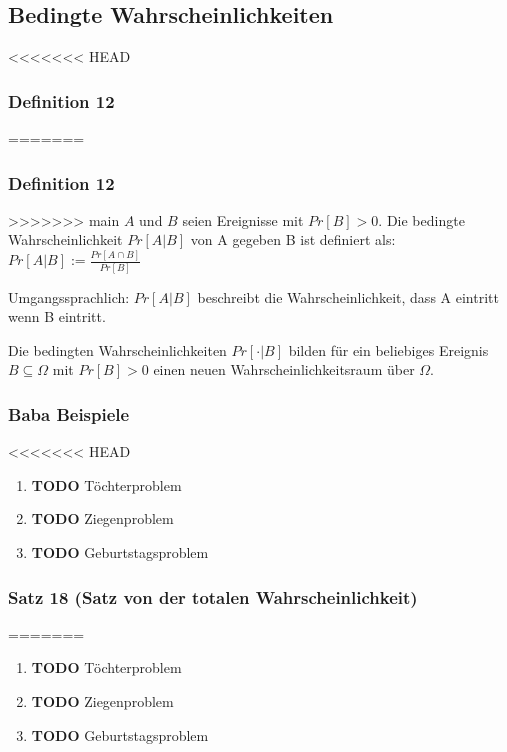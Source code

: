 \documentclass[11pt]{article}
\begin{document}
\begin{enumerate}
\subsection{Bedingte Wahrscheinlichkeiten}
<<<<<<< HEAD
\label{sec:org0a5a964}
\subsubsection{Definition 12}
\label{sec:org7a405d0}
=======
\label{sec:org276e34e}
\subsubsection{Definition 12}
\label{sec:org6f4c295}
>>>>>>> main
\(A\) und \(B\) seien Ereignisse mit \(Pr[B] > 0\). Die bedingte Wahrscheinlichkeit \(Pr[A|B]\) von A gegeben B ist definiert als:
\(Pr[A|B] := \frac{Pr[A \cap B]}{Pr[B]}\)

Umgangssprachlich: \(Pr[A|B]\) beschreibt die Wahrscheinlichkeit, dass A eintritt wenn B eintritt.

Die bedingten Wahrscheinlichkeiten \(Pr[·|B]\) bilden für ein beliebiges Ereignis \(B \subseteq \Omega\) mit \(Pr[B] > 0\) einen neuen Wahrscheinlichkeitsraum über \(\Omega\).


\subsubsection{Baba Beispiele}
<<<<<<< HEAD
\label{sec:org97271c7}
\begin{enumerate}
\item {\bfseries\sffamily TODO} Töchterproblem
\label{sec:org8229b3a}
\item {\bfseries\sffamily TODO} Ziegenproblem
\label{sec:org6a4c6f3}
\item {\bfseries\sffamily TODO} Geburtstagsproblem
\label{sec:org43d9c2c}
\end{enumerate}

\subsubsection{Satz 18 (Satz von der totalen Wahrscheinlichkeit)}
\label{sec:org70420d1}
=======
\label{sec:orgbb9b6e5}
\begin{enumerate}
\item {\bfseries\sffamily TODO} Töchterproblem
\label{sec:org7745b05}
\item {\bfseries\sffamily TODO} Ziegenproblem
\label{sec:orgf8cf0a7}
\item {\bfseries\sffamily TODO} Geburtstagsproblem
\label{sec:orgd6865d9}
\end{enumerate}


\end{enumerate}
\end{document}
